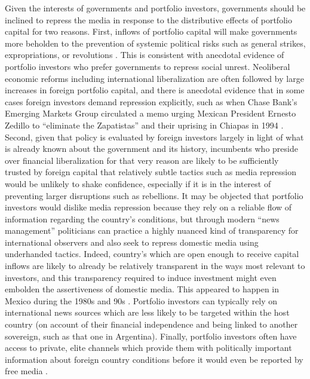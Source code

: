 \documentclass[a4paper]{article}\usepackage[]{graphicx}\usepackage[]{color}
\begin{document}
Given the interests of governments and portfolio investors, governments should be inclined to repress the media in response to the distributive effects of portfolio capital for two reasons. First, inflows of portfolio capital will make governments more beholden to the prevention of systemic political risks such as general strikes, expropriations, or revolutions \parencite{Clark:1997jg}. This is consistent with anecdotal evidence of portfolio investors who prefer governments to repress social unrest. Neoliberal economic reforms including international liberalization are often followed by large increases in foreign portfolio capital, and there is anecdotal evidence that in some cases foreign investors demand repression explicitly, such as when Chase Bank's Emerging Markets Group circulated a memo urging Mexican President Ernesto Zedillo to “eliminate the Zapatistas” and their uprising in Chiapas in 1994 \parencite{Silverstein:1995wc}. Second, given that policy is evaluated by foreign investors largely in light of what is already known about the government and its history, incumbents who preside over financial liberalization for that very reason are likely to be sufficiently trusted by foreign capital that relatively subtle tactics such as media repression would be unlikely to shake confidence, especially if it is in the interest of preventing larger disruptions such as rebellions. It may be objected that portfolio investors would dislike media repression because they rely on a reliable flow of information regarding the country's conditions, but through modern “news management” politicians can practice a highly nuanced kind of transparency for international observers and also seek to repress domestic media using underhanded tactics. Indeed, country's which are open enough to receive capital inflows are likely to already be relatively transparent in the ways most relevant to investors, and this transparency required to induce investment might even embolden the assertiveness of domestic media. This appeared to happen in Mexico during the 1980s and 90s \parencite{lawson2002building}. Portfolio investors can typically rely on international news sources which are less likely to be targeted within the host country (on account of their financial independence and being linked to another sovereign, such as that one in Argentina). Finally, portfolio investors often have access to private, elite channels which provide them with politically important information about foreign country conditions before it would even be reported by free media \parencite{Dube:2011ir}.
\end{document}
